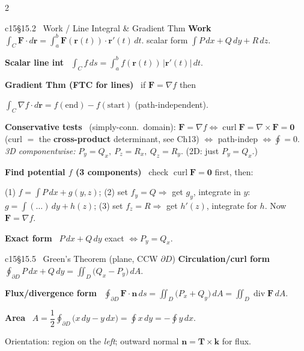 \documentclass[10pt]{extarticle}
\newcommand{\h}[1]{{\bfseries #1}\ }
\newcommand{\key}[1]{\colorbox{hl}{$#1$}}
\newcommand{\grad}{\nabla}
\renewcommand{\div}{\operatorname{div}}
\newcommand{\curl}{\operatorname{curl}}
\newcommand{\F}{\mathbf{F}}
\newcommand{\n}{\mathbf{n}}
\newcommand{\rr}{\mathbf{r}}
\begin{document}
\begin{multicols}{2}
\begin{tbox}{c15}{§15.2 \ Work / Line Integral \& Gradient Thm}
\h{Work} $\displaystyle\int_C \F\cdot d\rr=\int_a^b \F(\rr(t))\cdot \rr'(t)\,dt$.\;\; scalar form $\int P\,dx+Q\,dy+R\,dz$.\par
\h{Scalar line int} $\int_C f\,ds=\int_a^b f(\rr(t))\,|\rr'(t)|\,dt$.\par
\h{Gradient Thm (FTC for lines)} if $\F=\grad f$ then\par
\key{\textstyle\int_C \grad f\cdot d\rr=f(\text{end})-f(\text{start})} (path-independent).\par
\h{Conservative tests} (simply-conn.\ domain): $\F=\grad f\iff\curl\F=\grad\times\F=\mathbf0$ (curl $=$ the \textbf{cross-product} determinant, see Ch13) $\iff$ path-indep $\iff\oint=0$. \emph{3D componentwise:} $P_y{=}Q_x,\ P_z{=}R_x,\ Q_z{=}R_y$. (2D: just $P_y{=}Q_x$.)\par
\h{Find potential $f$ (3 components)} check $\curl\F=\mathbf0$ first, then:\par
(1) $f=\displaystyle\int P\,dx+g(y,z)$;\;\; (2) set $f_y=Q\Rightarrow$ get $g_y$, integrate in $y$: $g=\int(\dots)\,dy+h(z)$;\;\; (3) set $f_z=R\Rightarrow$ get $h'(z)$, integrate for $h$. Now $\F=\grad f$.\par
\h{Exact form} $P\,dx+Q\,dy$ exact $\iff P_y=Q_x$.
\end{tbox}

\begin{tbox}{c15}{§15.5 \ Green's Theorem (plane, CCW $\partial D$)}
\h{Circulation/curl form} $\displaystyle\oint_{\partial D}\!P\,dx+Q\,dy=\iint_D\!\big(Q_x-P_y\big)\,dA$.\par
\h{Flux/divergence form} $\displaystyle\oint_{\partial D}\!\F\cdot\n\,ds=\iint_D\!\big(P_x+Q_y\big)\,dA=\iint_D\!\div\F\,dA$.\par
\h{Area} $A=\dfrac12\oint_{\partial D}\!\big(x\,dy-y\,dx\big)=\oint x\,dy=-\oint y\,dx$.\par
Orientation: region on the \emph{left}; outward normal $\n=\mathbf T\times\mathbf k$ for flux.
\end{tbox}


\end{multicols}
\end{document}
